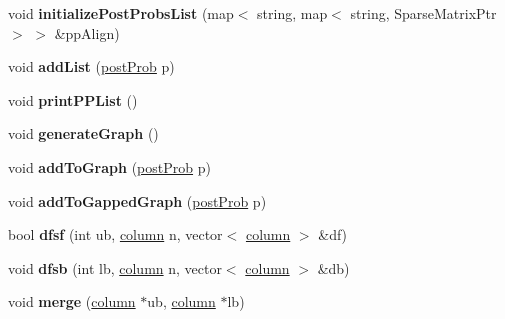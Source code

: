 \begin{DoxyCompactItemize}
void {\bfseries initialize\+Post\+Probs\+List} (map$<$ string, map$<$ string, Sparse\+Matrix\+Ptr $>$ $>$ \&pp\+Align)
\item 
\mbox{\label{classtops_1_1MultipleAlignment_a1de6f68c1db8eab24b46cd78ac1db9a6}} 
void {\bfseries add\+List} (\hyperlink{structtops_1_1postProb}{post\+Prob} p)
\item 
\mbox{\label{classtops_1_1MultipleAlignment_a545d7520ed30fb592fbe016aa8356fd9}} 
void {\bfseries print\+P\+P\+List} ()
\item 
\mbox{\label{classtops_1_1MultipleAlignment_a7ad20bb84d7b26f66f78e43c64ca8c03}} 
void {\bfseries generate\+Graph} ()
\item 
\mbox{\label{classtops_1_1MultipleAlignment_ab078f7feccb9a40c558cac5bd61abd91}} 
void {\bfseries add\+To\+Graph} (\hyperlink{structtops_1_1postProb}{post\+Prob} p)
\item 
\mbox{\label{classtops_1_1MultipleAlignment_a0b27fab3988e6c4c2bb06c5caa887c0e}} 
void {\bfseries add\+To\+Gapped\+Graph} (\hyperlink{structtops_1_1postProb}{post\+Prob} p)
\item 
\mbox{\label{classtops_1_1MultipleAlignment_ae47c17be6bbc3b33c4cc6fdef6cb6a5d}} 
bool {\bfseries dfsf} (int ub, \hyperlink{structtops_1_1column}{column} n, vector$<$ \hyperlink{structtops_1_1column}{column} $>$ \&df)
\item 
\mbox{\label{classtops_1_1MultipleAlignment_a63aeec5c698cb7cd0286f63864d0771f}} 
void {\bfseries dfsb} (int lb, \hyperlink{structtops_1_1column}{column} n, vector$<$ \hyperlink{structtops_1_1column}{column} $>$ \&db)
\item 
\mbox{\label{classtops_1_1MultipleAlignment_a02f3bc2d936a0d2aaaabaabd999899f4}} 
void {\bfseries merge} (\hyperlink{structtops_1_1column}{column} $\ast$ub, \hyperlink{structtops_1_1column}{column} $\ast$lb)
\item 
\mbox{\label{classtops_1_1MultipleAlignment_ab474aa9e0cb3dbddee7c5097c9f73f2b}} 

\end{DoxyCompactItemize}
